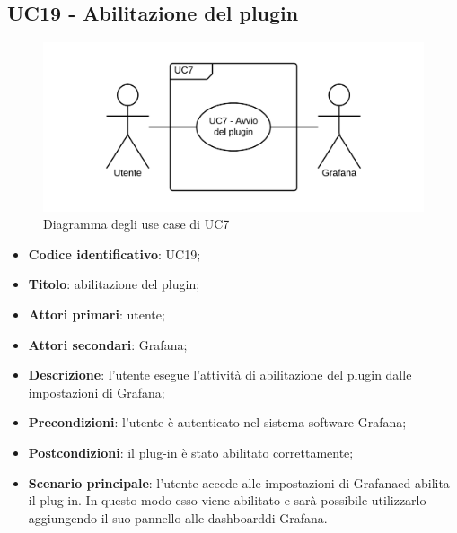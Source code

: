 \subsection{UC19 - Abilitazione del plugin}
\begin{figure}[H]
	\includegraphics{img/UC7_-_Avvio_plugin.png}
	\caption{Diagramma degli use case di UC7}
\end{figure}
\begin{itemize}
	\item \textbf{Codice identificativo}: UC19;
	\item \textbf{Titolo}: abilitazione del plugin;
	\item \textbf{Attori primari}: utente;
	\item \textbf{Attori secondari}: Grafana\glo;
	\item \textbf{Descrizione}: l'utente esegue l'attività di abilitazione del plugin dalle impostazioni di Grafana\glo;
	\item \textbf{Precondizioni}: l'utente è autenticato nel sistema software Grafana\glo;
	\item \textbf{Postcondizioni}: il plug-in è stato abilitato correttamente;
	\item \textbf{Scenario principale}: l'utente accede alle impostazioni di Grafana\glosp ed abilita il plug-in. In questo modo esso viene abilitato e sarà possibile utilizzarlo aggiungendo il suo pannello alle dashboard\glosp di Grafana\glo.
\end{itemize}

